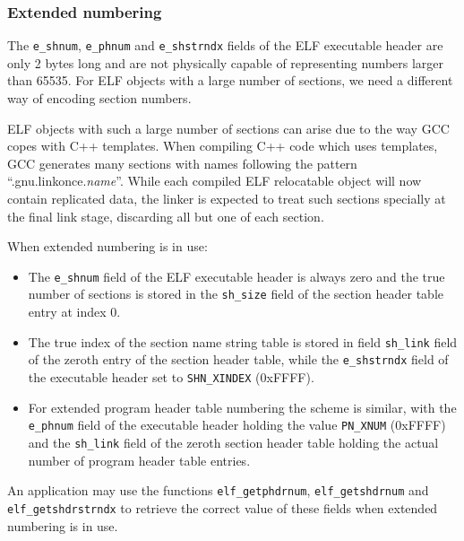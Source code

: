 \documentclass[a4paper,pdftex]{book}
\newcommand{\constant}[1]{\texttt{#1}}
\newcommand{\function}[1]{\texttt{#1}}
\newcommand{\parameter}[1]{\texttt{#1}}
\begin{document}
\subsubsection{Extended numbering}\label{sec.extended-numbering}

%        
The \parameter{e\_shnum}, \parameter{e\_phnum} and
\parameter{e\_shstrndx} fields of the ELF executable header are only 2
bytes long and are not physically capable of representing numbers
larger than 65535.  For ELF objects with a large number of sections,
we need a different way of encoding section numbers.%

ELF objects with such a large number of sections can arise due to the
way GCC copes with C++ templates.  When compiling C++ code which uses
templates, GCC generates many sections with names following the
pattern ``.gnu.linkonce.\textit{name}''.  While each compiled ELF
relocatable object will now contain replicated data, the linker is
expected to treat such sections specially at the final link stage,
discarding all but one of each section.

When extended numbering is in use:

\begin{itemize}
\item The \parameter{e\_shnum} field of the ELF executable header is
  always zero and the true number of sections is stored in the
  \parameter{sh\_size} field of the section header table entry at
  index 0.
\item The  true index of the
  section name string table is stored in field \parameter{sh\_link}
  field of the zeroth entry of the section header table, while the
  \parameter{e\_shstrndx} field of the executable header set to
  \constant{SHN\_XINDEX} (0xFFFF).
\item {} For extended
  program header table numbering the scheme is similar, with the
  \parameter{e\_phnum} field of the executable header holding the
  value \constant{PN\_XNUM} (0xFFFF) and the \parameter{sh\_link}
  field of the zeroth section header table holding the actual number
  of program header table entries.
\end{itemize}

An  application may use
the functions \function{elf\_getphdrnum}, \function{elf\_getshdrnum}
and \function{elf\_getshdrstrndx} to retrieve the correct value of
these fields when extended numbering is in use.
\end{document}
